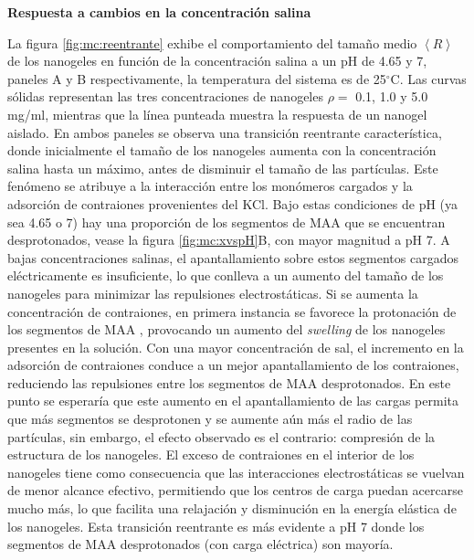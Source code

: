 	\textbf{Respuesta a cambios en la concentraci\'on salina}
	
	La figura \ref{fig:mc:reentrante} exhibe el comportamiento del tama\~no medio $\left<R\right>$ de los nanogeles en funci\'on de la concentraci\'on salina a un pH de 4.65 y 7, paneles A y B respectivamente, la temperatura del sistema es de 25$^\circ$C. Las curvas s\'olidas representan las tres concentraciones de nanogeles $\rho =$ 0.1, 1.0 y 5.0 mg/ml, mientras que la l\'inea punteada muestra la respuesta de un nanogel aislado. En ambos paneles se observa una transici\'on reentrante caracter\'istica, donde inicialmente el tama\~no de los nanogeles aumenta con la concentraci\'on salina hasta un m\'aximo, antes de disminuir el tama\~no de las part\'iculas. Este fen\'omeno se atribuye a la interacci\'on entre los mon\'omeros cargados y la adsorci\'on de contraiones provenientes del KCl. Bajo estas condiciones de pH (ya sea 4.65 o 7) hay una proporci\'on de los segmentos de MAA que se encuentran desprotonados, vease la figura \ref{fig:mc:xvspH}B, con mayor magnitud a pH 7. A bajas concentraciones salinas, el apantallamiento sobre estos segmentos cargados el\'ectricamente es insuficiente, lo que conlleva a un aumento del tama\~no de los nanogeles para minimizar las repulsiones electrost\'aticas. Si se aumenta la concentraci\'on de contraiones, en primera instancia se favorece la protonaci\'on de los segmentos de MAA \cite{perez2021thermodynamic}, provocando un aumento del \textit{swelling} de los nanogeles presentes en la soluci\'on. Con una mayor concentraci\'on de sal, el incremento en la adsorci\'on de contraiones  conduce a un mejor apantallamiento de los contraiones, reduciendo las repulsiones entre los segmentos de MAA desprotonados. En este punto se esperar\'ia que este aumento en el apantallamiento de las cargas permita que m\'as segmentos se desprotonen y se aumente a\'un m\'as el radio de las part\'iculas, sin embargo, el efecto observado es el contrario: compresi\'on de la estructura de los nanogeles. El exceso de contraiones en el interior de los nanogeles tiene como consecuencia que las interacciones electrost\'aticas se vuelvan de menor alcance efectivo, permitiendo que los centros de carga puedan acercarse mucho m\'as, lo que facilita una relajaci\'on y disminuci\'on en la energ\'ia el\'astica de los nanogeles. Esta transici\'on reentrante es m\'as evidente a pH 7 donde los segmentos de MAA desprotonados (con carga el\'ectrica) son mayor\'ia.
	
